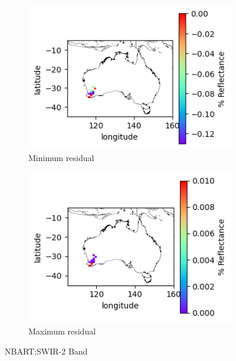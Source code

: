 \documentclass[a4paper]{article}
\begin{document}
      \begin{figure}[h!]
        \centering
          \begin{subfigure}[l]{.4\linewidth}
            \hspace{-32mm}
            \includegraphics[scale=0.9]{plots/nbart/nbart_swir_2-MinResidual.png}
            \caption{Minimum residual}
          \end{subfigure}
%
          \begin{subfigure}[r]{.4\linewidth}
            \includegraphics[scale=0.9]{plots/nbart/nbart_swir_2-MaxResidual.png}
            \caption{Maximum residual}
          \end{subfigure}
        \caption{NBART;\@ SWIR-2 Band}\label{figure:19}
      \end{figure}
\end{document}
